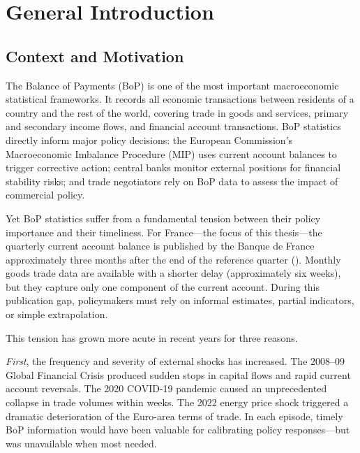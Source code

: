 \chapter*{General Introduction}

\section*{Context and Motivation}

The Balance of Payments (BoP) is one of the most important macroeconomic statistical frameworks.  It records all economic transactions between residents of a country and the rest of the world, covering trade in goods and services, primary and secondary income flows, and financial account transactions.  BoP statistics directly inform major policy decisions: the European Commission's Macroeconomic Imbalance Procedure (MIP) uses current account balances to trigger corrective action; central banks monitor external positions for financial stability risks; and trade negotiators rely on BoP data to assess the impact of commercial policy.

Yet BoP statistics suffer from a fundamental tension between their policy importance and their timeliness.  For France---the focus of this thesis---the quarterly current account balance is published by the Banque de France approximately three months after the end of the reference quarter (\cite{imf2009bpm6}).  Monthly goods trade data are available with a shorter delay (approximately six weeks), but they capture only one component of the current account.  During this publication gap, policymakers must rely on informal estimates, partial indicators, or simple extrapolation.

This tension has grown more acute in recent years for three reasons.

\emph{First}, the frequency and severity of external shocks has increased.  The 2008--09 Global Financial Crisis produced sudden stops in capital flows and rapid current account reversals.  The 2020 COVID-19 pandemic caused an unprecedented collapse in trade volumes within weeks.  The 2022 energy price shock triggered a dramatic deterioration of the Euro-area terms of trade.  In each episode, timely BoP information would have been valuable for calibrating policy responses---but was unavailable when most needed.

